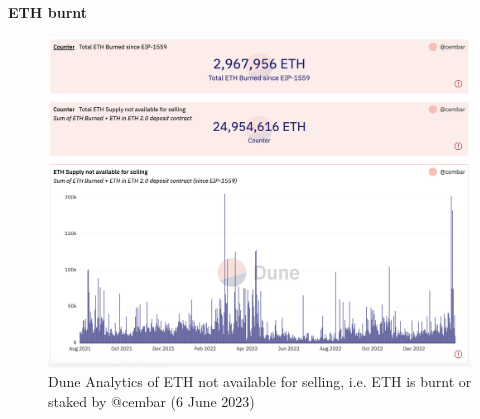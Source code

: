 \documentclass[UTF8]{article}
\begin{document}
{\clearpage
\noindent

\textbf{ETH burnt}
\begin{figure}[htbp]
\begin{center}
\includegraphics[width=\linewidth]{images/cembar1}
\caption{Dune Analytics of ETH not available for selling, i.e. ETH is burnt or staked by @cembar (6 June 2023)}
\label{fig:cembar1}
\end{center}
\end{figure}

}
\end{document}
